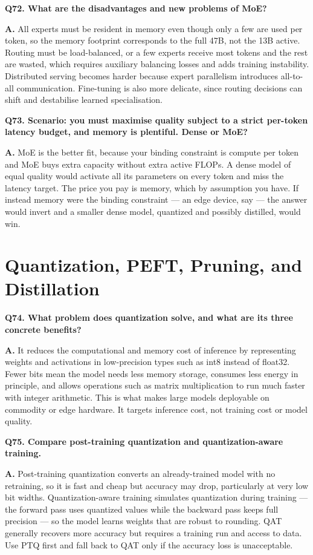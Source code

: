 \documentclass[11pt]{article}
\begin{document}
\medskip
\noindent\textbf{Q72. What are the disadvantages and new problems of MoE?}

\noindent\textbf{A.} All experts must be resident in memory even though only a few are used per token, so the memory footprint corresponds to the full 47B, not the 13B active. Routing must be load-balanced, or a few experts receive most tokens and the rest are wasted, which requires auxiliary balancing losses and adds training instability. Distributed serving becomes harder because expert parallelism introduces all-to-all communication. Fine-tuning is also more delicate, since routing decisions can shift and destabilise learned specialisation.

\medskip
\noindent\textbf{Q73. Scenario: you must maximise quality subject to a strict per-token latency budget, and memory is plentiful. Dense or MoE?}

\noindent\textbf{A.} MoE is the better fit, because your binding constraint is compute per token and MoE buys extra capacity without extra active FLOPs. A dense model of equal quality would activate all its parameters on every token and miss the latency target. The price you pay is memory, which by assumption you have. If instead memory were the binding constraint --- an edge device, say --- the answer would invert and a smaller dense model, quantized and possibly distilled, would win.

\section{Quantization, PEFT, Pruning, and Distillation}

\noindent\textbf{Q74. What problem does quantization solve, and what are its three concrete benefits?}

\noindent\textbf{A.} It reduces the computational and memory cost of inference by representing weights and activations in low-precision types such as int8 instead of float32. Fewer bits mean the model needs less memory storage, consumes less energy in principle, and allows operations such as matrix multiplication to run much faster with integer arithmetic. This is what makes large models deployable on commodity or edge hardware. It targets inference cost, not training cost or model quality.

\medskip
\noindent\textbf{Q75. Compare post-training quantization and quantization-aware training.}

\noindent\textbf{A.} Post-training quantization converts an already-trained model with no retraining, so it is fast and cheap but accuracy may drop, particularly at very low bit widths. Quantization-aware training simulates quantization during training --- the forward pass uses quantized values while the backward pass keeps full precision --- so the model learns weights that are robust to rounding. QAT generally recovers more accuracy but requires a training run and access to data. Use PTQ first and fall back to QAT only if the accuracy loss is unacceptable.
\end{document}
